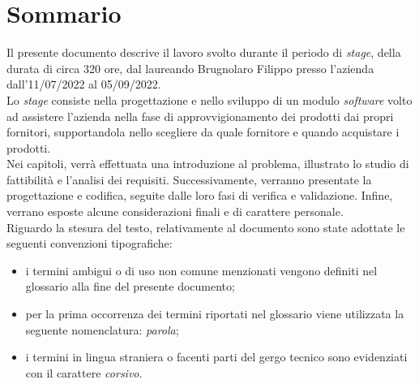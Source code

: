 
\cleardoublepage
{}
{}
\begingroup
\let\clearpage\relax
\let\cleardoublepage\relax
\let\cleardoublepage\relax

\chapter*{Sommario}

\noindent Il presente documento descrive il
lavoro svolto durante il periodo di \textit{stage},
della durata di circa 320 ore, dal laureando
Brugnolaro Filippo presso l'azienda
\textit{\myCompany} dall'11/07/2022 al
05/09/2022.\\
\noindent Lo \textit{stage} consiste nella progettazione e nello sviluppo di un modulo \textit{software} volto
ad assistere l'azienda nella fase di approvvigionamento dei prodotti dai propri fornitori, supportandola nello scegliere
da quale fornitore e quando acquistare i prodotti.\\
Nei capitoli, verrà effettuata una introduzione al problema, illustrato lo studio di fattibilità e l'analisi dei requisiti.
Successivamente, verranno presentate la progettazione e codifica, seguite dalle loro fasi di verifica e validazione.
Infine, verrano esposte alcune considerazioni finali e di carattere personale.\\
\noindent Riguardo la stesura del testo, relativamente al documento sono state adottate le seguenti convenzioni tipografiche:
\begin{itemize}
	\item i termini ambigui o di uso non comune menzionati vengono definiti nel glossario alla fine del presente documento;
	\item per la prima occorrenza dei termini riportati nel glossario viene utilizzata la seguente nomenclatura: \emph{parola}\glsfirstoccur;
	\item i termini in lingua straniera o facenti parti del gergo tecnico sono evidenziati con il carattere \emph{corsivo}.
\end{itemize}

%
%

\endgroup			

\vfill

